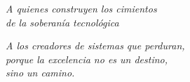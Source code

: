 \thispagestyle{empty}
\vspace*{5cm}

\begin{center}
    \Large
    \textit{A quienes construyen los cimientos\\de la soberanía tecnológica}
    
    \vspace{2cm}
    
    \textit{A los creadores de sistemas que perduran,\\porque la excelencia no es un destino,\\sino un camino.}
\end{center}

\vfill
\newpage
